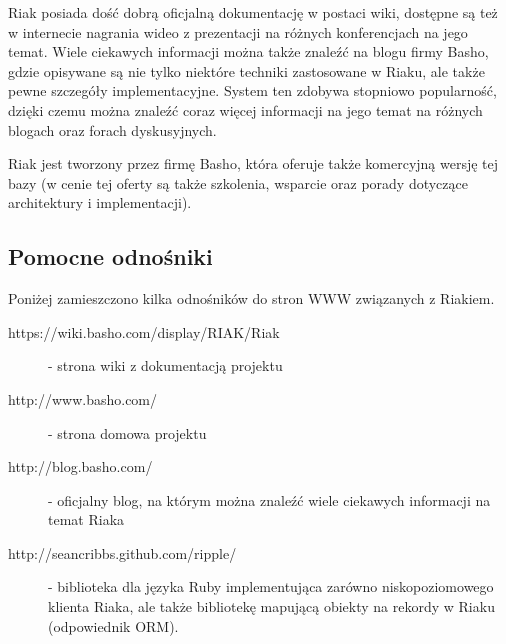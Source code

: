 Riak posiada dość dobrą oficjalną dokumentację w postaci wiki, dostępne są też w internecie nagrania wideo z prezentacji na różnych konferencjach na jego temat.
Wiele ciekawych informacji można także znaleźć na blogu firmy Basho, gdzie opisywane są nie tylko niektóre techniki zastosowane w Riaku, ale także pewne szczegóły implementacyjne.
System ten zdobywa stopniowo popularność, dzięki czemu można znaleźć coraz więcej informacji na jego temat na różnych blogach oraz forach dyskusyjnych.

Riak jest tworzony przez firmę Basho, która oferuje także komercyjną wersję tej bazy (w cenie tej oferty są także szkolenia, wsparcie oraz porady dotyczące architektury i implementacji).

\subsection*{Pomocne odnośniki}
 
Poniżej zamieszczono kilka odnośników do stron WWW związanych z Riakiem.

\begin{description}
 \item [https://wiki.basho.com/display/RIAK/Riak] - strona wiki z dokumentacją projektu
 \item [http://www.basho.com/] - strona domowa projektu
 \item [http://blog.basho.com/] - oficjalny blog, na którym można znaleźć wiele ciekawych informacji na temat Riaka
 \item [http://seancribbs.github.com/ripple/] - biblioteka dla języka Ruby implementująca zarówno niskopoziomowego klienta Riaka, ale także bibliotekę mapującą obiekty na rekordy w Riaku (odpowiednik ORM).
\end{description}
